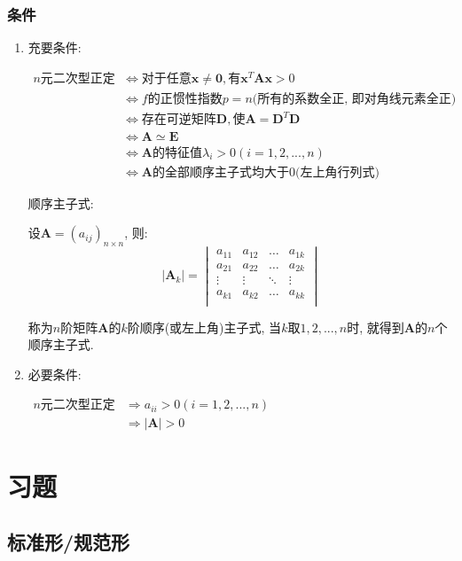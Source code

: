 \subsubsection{条件}
\begin{enumerate}
\item 充要条件: \par $
\begin{aligned}
n\text{元二次型正定} & \Leftrightarrow \text{对于任意}\bm{x}\neq \bm{0}, \text{有}\bm{x}^{T}\bm{A}\bm{x}>0 \\
& \Leftrightarrow f\text{的正惯性指数} p=n\text{(所有的系数全正, 即对角线元素全正)} \\
& \Leftrightarrow \text{存在可逆矩阵} \bm{D}, \text{使} \bm{A}=\bm{D}^{T}\bm{D} \\
& \Leftrightarrow \bm{A}\simeq \bm{E} \\
& \Leftrightarrow \bm{A}\text{的特征值} \lambda_{i}>0(i=1, 2,... ,n) \\
& \Leftrightarrow \bm{A}\text{的全部顺序主子式均大于0(左上角行列式)}
\end{aligned} $ \par
顺序主子式: \par
设$\bm{A}=(a_{ij})_{n\times n}$, 则:
\begin{equation*}
|\bm{A}_{k}|=
\begin{vmatrix}
a_{11} & a_{12} & \dots & a_{1k} \\
a_{21} & a_{22} & \dots & a_{2k} \\
\vdots & \vdots & \ddots & \vdots \\
a_{k1} & a_{k2} & \dots & a_{kk} \\
\end{vmatrix}
\end{equation*} \par
称为$n$阶矩阵$\bm{A}$的$k$阶顺序(或左上角)主子式, 当$k$取$1,2,...,n$时, 就得到$\bm{A}$的$n$个顺序主子式.
\item 必要条件: \par $
\begin{aligned}
n\text{元二次型正定} & \Rightarrow a_{ii}>0(i=1, 2,... ,n) \\
& \Rightarrow \left|\bm{A}\right|>0
\end{aligned} $
\end{enumerate}
\section{习题}
\subsection{标准形/规范形}
